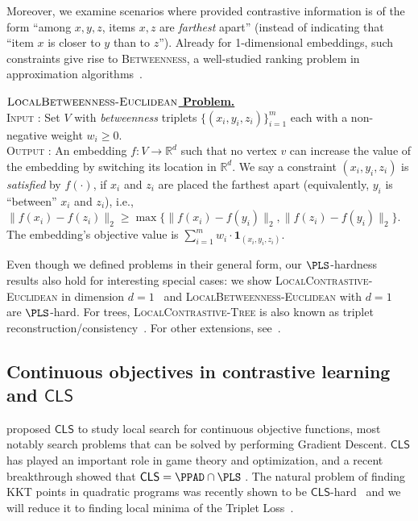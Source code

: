 \documentclass{article}
\theoremstyle{definition}  %
\theoremstyle{plain}
\numberwithin{observation}{section}
\numberwithin{claim}{section}
\numberwithin{fact}{section}
\numberwithin{lemma}{section}
\numberwithin{proposition}{section}
\numberwithin{theorem}{section}
\numberwithin{corollary}{section}
\numberwithin{definition}{section}
\newcommand{\CLS}{\mathsf{CLS}}
\newcommand{\x}{x}
\newcommand{\y}{y}
\newcommand{\z}{z}
\newcommand{\anc}{\x}
\newcommand{\pos}{\y}
\renewcommand{\neg}{\z}
\newenvironment{nproblem}[1][\unskip]{%
  \medskip
  \begin{mdframed}
  \noindent
  \textbf{\underline{$#1$ Problem.}} \\
  \noindent
}{%
  \end{mdframed}
  \medskip %
}
\theoremstyle{plain}
\begin{document}
Moreover, we examine scenarios where provided contrastive information is of the form ``among $x,y,z$, items $x,z$ are \textit{farthest} apart'' (instead of indicating that ``item $x$ is closer to $y$ than to $z$''). Already for 1-dimensional embeddings, such constraints give rise to \textsc{Betweenness}, a well-studied ranking problem in approximation algorithms~\citep{arora2002new,charikar2009every,austrin2015np}.

\begin{nproblem}[\textsc{LocalBetweenness-Euclidean}] \label{def:local-ranking}
\textsc{Input :} Set $V$  with \textit{betweenness} triplets $\{(\anc_i, \pos_i, \neg_{i})\}_{i = 1}^m$ each with a non-negative weight $w_i \ge 0$.
\\
  \noindent \textsc{Output :}  An embedding $f: V \to \mathbb{R}^d$ such that no vertex $v$ can increase the value of the embedding by switching its location in $\mathbb{R}^d$. We say a constraint $(x_i, y_i, z_i)$ is \emph{satisfied} by $f(\cdot)$, if $x_i$ and $z_i$ are placed the farthest apart (equivalently, $y_i$ is ``between'' $x_i$ and $z_i$), i.e., $\|f(x_i) - f(z_i)\|_2 \ge \max\{\|f(x_i) - f(y_i)\|_2, \|f(z_i) - f(y_i)\|_2\}$. The embedding's objective value is $\sum_{i=1}^m w_i \cdot \mathbf{1}_{(x_i, y_i, z_i)}$.
\end{nproblem}

Even though we defined problems in their general form, our $\PLS$-hardness results also hold for interesting special cases: we show \textsc{LocalContrastive-Euclidean} in dimension $d=1$~\citep{buadoiu2008ordinal,alon2008ordinal,fan2020learning} and \textsc{LocalBetweenness-Euclidean} with $d=1$~\citep{arora2002new,charikar2009every,austrin2015np} are $\PLS$-hard. For trees, \textsc{LocalContrastive-Tree} is also known as triplet reconstruction/consistency~\citep{byrka2010new,chatziafratis2023triplet}. For other extensions, see~.


\subsection{Continuous objectives in contrastive learning and \texorpdfstring{$\CLS$}{CLS}}
\citet{daskalakis2011continuous} proposed $\CLS$ to study local search for continuous objective functions, most notably search problems that can be solved by performing Gradient Descent. $\CLS$ has played an important role in game theory and optimization, and a recent breakthrough showed that $\CLS = \PPAD \cap \PLS$ \citep{Fearnley23:Complexity}. The natural problem of finding KKT points in quadratic programs was recently shown to be $\CLS$-hard~\citep{fearnley2024complexity} and we will reduce it to finding local minima of the Triplet Loss~\citep{schroff2015facenet}. 
\end{document}

